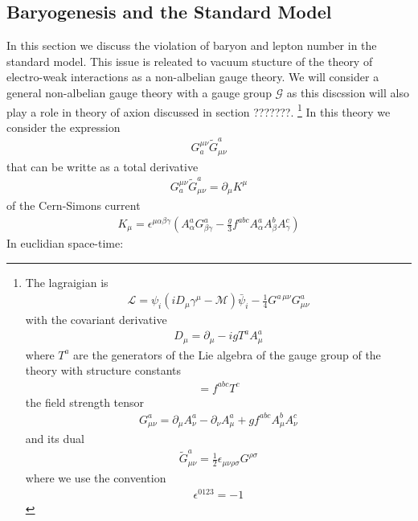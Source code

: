 \documentclass[13pt,a4paper,twoside,titlepage]{article}
\begin{document}
\subsection{Baryogenesis and the Standard Model}
In this section we discuss the violation of baryon and lepton number in the standard model. This issue is releated to vacuum stucture of the theory of electro-weak interactions as a
non-albelian gauge theory.
We will consider a general non-albelian gauge theory with a gauge group $\mathcal{G}$ as this discssion will also play a role in theory of axion discussed in section ???????.  \footnote{
The lagraigian is
\begin{align}
    \mathcal{L} = \psi_i \left( i D_\mu \gamma^\mu - \mathcal{M} \right) \bar{\psi}_i - \frac{1}{4} G^{a \, \mu \nu} G^a_{\mu \nu}
\end{align}
with the covariant derivative
\begin{align}
    D_\mu = \partial_\mu - i g T^a A^a_\mu
\end{align}
where $T^a$ are the generators of the Lie algebra of the gauge group of the theory with structure constants
\begin{align}
    [T^a, T^b] = f^{abc} T^c
\end{align}
the field strength tensor
\begin{align}
    G^a_{\mu \nu} = \partial_\mu A^a_\nu - \partial_\nu A^a_\mu + g f^{abc} A^b_\mu A^c_\nu
\end{align}
and its dual
\begin{align}
    \tilde{G}_{\mu \nu}^a = \frac{1}{2} \epsilon_{\mu \nu \rho \sigma} G^{\rho \sigma}
\end{align}
where we use the convention
\begin{align}
    \epsilon^{0123} = -1
\end{align}
}
In this theory we consider the expression
\begin{align}
    G^{\mu \nu}_a \tilde{G}^a_{\mu \nu}
\end{align}
that can be writte as a total derivative
\begin{align}
    G^{\mu \nu}_a \tilde{G}^a_{\mu \nu} = \partial_\mu K^\mu
\end{align}
of the Cern-Simons current
\begin{align}
    K_\mu = \epsilon^{\mu \alpha \beta \gamma} \left( A^a_\alpha G^a_{\beta \gamma} - \frac{g}{3} f^{abc} A^a_\alpha A^b_\beta A^c_\gamma \right)
\end{align}
In euclidian space-time:
\end{document}
